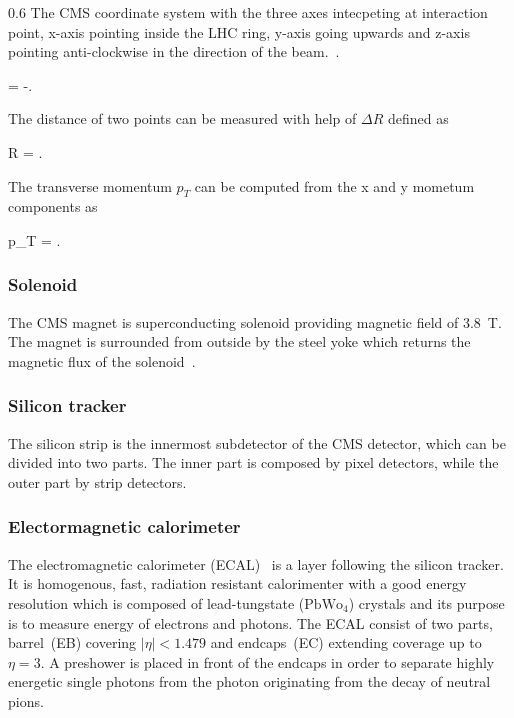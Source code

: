                  {0.6}       %
                 { The CMS coordinate system with the three axes intecpeting at interaction point, x-axis pointing inside the LHC ring, y-axis going upwards and z-axis pointing anti-clockwise in the direction of the beam.~\cite{Pantaleo:2293435}. }

{
    \eta =  -.
}

The distance of two points can be measured with help of $\Delta R$ defined as

{
    \Delta R = .
}


The transverse momentum $p_{T}$ can be computed from the x and y mometum components as

{
    p_{T} =  .
}


\subsubsection{Solenoid}


The CMS magnet is superconducting solenoid providing magnetic field of 3.8~T. The magnet is surrounded from outside by the steel yoke which returns the magnetic flux of the solenoid~\cite{tdrMagnet}.

\subsubsection{Silicon tracker}

The silicon strip is the innermost subdetector of the CMS detector, which can be divided into two parts. The inner part is composed by pixel detectors, while the outer part by strip detectors.

\subsubsection{Electormagnetic calorimeter}

The electromagnetic calorimeter (ECAL)~\cite{tdrECAL} is a layer following the silicon tracker. It is homogenous, fast, radiation resistant calorimenter with a good energy resolution which is composed of lead-tungstate ($\mathrm{PbWo_{4}}$) crystals and its purpose is to measure energy of electrons and photons. The ECAL consist of two parts, barrel~(EB) covering $|\eta|<1.479$ and endcaps~(EC) extending coverage up to $\eta =3$. A preshower is placed in front of the endcaps in order to separate highly energetic single photons from the photon originating from the decay of neutral pions.

